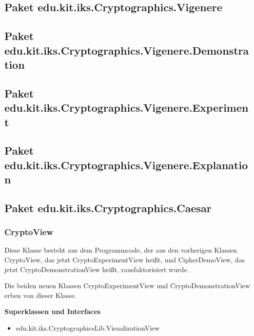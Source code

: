 \documentclass{article}
\begin{document}
  \subsection{Paket edu.kit.iks.Cryptographics.Vigenere}

  \subsection{Paket edu.kit.iks.Cryptographics.Vigenere.Demonstration}

  \subsection{Paket edu.kit.iks.Cryptographics.Vigenere.Experiment}

  \subsection{Paket edu.kit.iks.Cryptographics.Vigenere.Explanation}

  \subsection{Paket edu.kit.iks.Cryptographics.Caesar}
   \subsubsection{CryptoView}
          Diese Klasse besteht aus dem Programmcode, der aus den vorherigen Klassen CryptoView, das jetzt CryptoExperimentView heißt,
          und CipherDemoView, das jetzt CryptoDemonstrationView heißt, rausfaktorisiert wurde.
          
          Die beiden neuen Klassen CryptoExperimentView und CryptoDemonstrationView erben von dieser Klasse.\newline
           
    \textbf{Superklassen und Interfaces}
      \begin{itemize}
        \item  edu.kit.iks.CryptographicsLib.VisualizationView
      \end{itemize}
           
\end{document}

